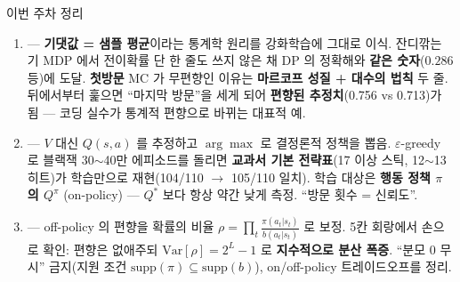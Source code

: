 \documentclass[aspectratio=169,11pt]{beamer}
\begin{document}

\begin{frame}{이번 주차 정리}
  \begin{enumerate}
    \item {} --- \textbf{기댓값 = 샘플
      평균}이라는 통계학 원리를 강화학습에 그대로 이식.
      잔디깎는 기 MDP 에서 전이확률 단 한 줄도 쓰지 않은 채
      DP 의 정확해와 \textbf{같은 숫자}($0.286$ 등)에
      도달. \textbf{첫방문} MC 가 무편향인 이유는
      \textbf{마르코프 성질 + 대수의 법칙} 두 줄. 뒤에서부터
      훑으면 ``마지막 방문''을 세게 되어 \textbf{편향된
      추정치}(0.756 vs 0.713)가 됨 --- 코딩 실수가 통계적
      편향으로 바뀌는 대표적 예.
    \item {} --- $V$ 대신 $Q(s,a)$ 를
      추정하고 $\arg\max$ 로 결정론적 정책을 뽑음.
      $\varepsilon$-greedy 로 블랙잭 30$\sim$40만 에피소드를
      돌리면 \textbf{교과서 기본 전략표}(17 이상 스틱,
      12$\sim$13 히트)가 학습만으로 재현(104/110 $\to$ 105/110
      일치). 학습 대상은 \textbf{행동 정책 $\pi$ 의
      $Q^\pi$} (on-policy) --- $Q^{*}$ 보다 항상 약간
      낮게 측정. ``방문 횟수 = 신뢰도''.
    \item {} --- off-policy 의
      편향을 확률의 비율
      $\rho = \prod_t \frac{\pi(a_t|s_t)}{b(a_t|s_t)}$
      로 보정. 5칸 회랑에서 손으로 확인: 편향은 없애주되
      $\text{Var}[\rho] = 2^L - 1$ 로 \textbf{지수적으로
      분산 폭증}. ``분모 0 무시'' 금지(지원 조건
      $\text{supp}(\pi) \subseteq \text{supp}(b)$),
      on/off-policy 트레이드오프를 정리.
  \end{enumerate}
\end{frame}
\end{document}
